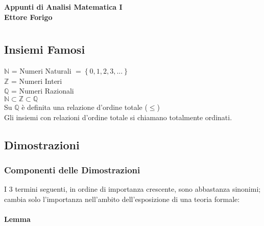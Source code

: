 \documentclass[a4paper, twoside, italian, 11pt]{book}
\newcommand{\braces}[1] {\left \{ #1 \right \}}
\newcommand{\N}{\mathbb{N}}
\newcommand{\Z}{\mathbb{Z}}
\newcommand{\Q}{\mathbb{Q}}
\begin{document}
\pagestyle{headings}

\frontmatter

\begin{titlepage}
	\begin{center}
		{\huge \bfseries Appunti di Analisi Matematica I \\}
		\vspace{1.5cm}
		{\Large \bfseries Ettore Forigo}
	\end{center}
\end{titlepage}

\mainmatter

\chapter{}



\section{Insiemi Famosi}

\noindent
$\N$ = Numeri Naturali $= \braces{0, 1, 2, 3, ...}$ \\
$\Z$ = Numeri Interi \\
$\Q$ = Numeri Razionali \\

\noindent
$\N \subset \Z \subset \Q$ \\

\noindent
Su $\Q$ è definita una relazione d'ordine totale  ($\leq$) \\

\noindent
Gli insiemi con relazioni d'ordine totale si chiamano totalmente ordinati.



\section{Dimostrazioni}


\subsection{Componenti delle Dimostrazioni}

\noindent
I 3 termini seguenti, in ordine di importanza crescente, sono abbastanza sinonimi; cambia solo l'importanza nell'ambito dell'esposizione di una teoria formale:


\subsubsection{Lemma}
\end{document}
